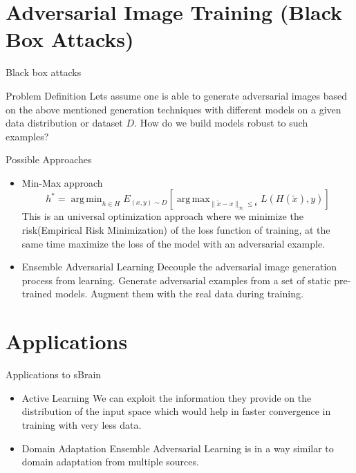 \documentclass[10pt]{beamer}
\DeclareMathOperator*{\argmax}{arg\,max}
\DeclareMathOperator*{\argmin}{arg\,min}
\begin{document}
\section{Adversarial Image Training   (Black Box Attacks)}
\begin{frame}{Black box attacks}
	\begin{block}{Problem Definition}
		Lets assume one is able to generate adversarial images based on the above mentioned generation techniques with different models on a given data distribution or dataset $\textit{D}$. How do we build models robust to such examples? 
	\end{block}
	
\end{frame}
\begin{frame}{Possible Approaches}
\begin{itemize}
	\item[] {
		\begin{block}{Min-Max approach}
			\pause
			\begin{equation}\label{madry-approach}
				h^* = \argmin_{h \in H} E_{(x,y) \sim D}[ \argmax_{\|\tilde{x} - x\|_{\infty} \leq \epsilon} L(H(\tilde{x}),y)]  
			\end{equation}
			This is an universal optimization approach where we minimize the risk(Empirical Risk Minimization) of the loss function of training, at the same time maximize the loss of the model with an adversarial example.
		\end{block}
	}
	\pause
	\item[] {
		\begin{block}{Ensemble Adversarial Learning}
			\pause
			Decouple the adversarial image generation process from learning. Generate adversarial examples from a set of static pre-trained models. Augment them with the real data during training.
		\end{block}
	}
\end{itemize}
		
	
\end{frame}

\section{Applications}
\begin{frame}{Applications to sBrain}
	\begin{itemize}
		\item[]  {
			\begin{block}{Active Learning}
				We can exploit the information they provide on the distribution of the input space which would help in faster convergence in training with very less data.
			\end{block}
		}
		\pause
		\item[] {
			\begin{block}{Domain Adaptation}
				Ensemble Adversarial Learning is in a way similar to domain adaptation from multiple sources.
			\end{block}
		}
	\end{itemize}
\end{frame}
\end{document}
